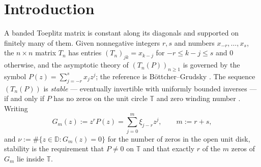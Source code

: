 \documentclass[11pt]{amsart}
\numberwithin{equation}{section}
\theoremstyle{definition}
\theoremstyle{remark}
\newcommand{\T}{\mathbb T}
\newcommand{\D}{\mathbb D}
\begin{document}
\begin{abstract}
small-ball mass at a constant lattice radius, and every fixed primitive
\(q\)-th root has an exact atom local limit
\(\gamma_qN^{-\varphi(q)/2}\), with an explicit kernel-covolume constant
\(\gamma_q\), on the admissible parity residue classes, and has no atom on the
inadmissible classes. Hence any fixed finite set of cyclotomic orders has an
exact-zero asymptotic on its first nonempty totient layer. Consequently a
fixed bounded-denominator non-real grid has a peeled exact-zero layer formula
after removing all orders below any fixed cyclotomic degree threshold, and the
unpeeled fixed-\(Q\) union has the full expansion
\(c_Q(N)/N+e_Q(N)/N^2+o_Q(N^{-2})\).  Here \(c_Q(N)\) receives contributions
\(2\sqrt3/\pi\) from each of the primitive cubic and sixth pairs on \(3\mid N\),
and \(4/\pi\) from the primitive quartic pair on \(4\mid N\), while \(e_Q(N)\)
combines the second-order corrections to those degree-two atoms, their explicit
pairwise overlaps, and the first nonquadratic layer.  After removing the
cyclotomic degree-two roots, that nonquadratic layer is also explicit: orders
\(5,8,10,12\) contribute at scale \(N^{-2}\), with constants
\(20\sqrt5/\pi^2,64/\pi^2,20\sqrt5/\pi^2,48/\pi^2\) on their admissible
divisibility classes.  If the two endpoints are included, the full
bounded-denominator root-of-unity grid has, through order \(N^{-1}\), the exact
central-binomial endpoint-union term plus the same non-real coefficient
\(c_Q(N)/N\).
\end{abstract}

\maketitle

\section{Introduction}\label{sec:intro}

A banded Toeplitz matrix is constant along its diagonals and supported on finitely many of them. Given nonnegative integers $r,s$ and numbers $x_{-r},\dots,x_s$, the $n\times n$ matrix $T_n$ has entries $(T_n)_{jk}=x_{k-j}$ for $-r\le k-j\le s$ and $0$ otherwise, and the asymptotic theory of $(T_n(P))_{n\ge1}$ is governed by the symbol $P(z)=\sum_{j=-r}^{s}x_jz^j$; the reference is B\"ottcher--Grudsky \cite{BG}. The sequence $(T_n(P))$ is \emph{stable} --- eventually invertible with uniformly bounded inverses --- if and only if $P$ has no zeros on the unit circle $\T$ and zero winding number \cite[Ch.~3]{BG}. Writing
\begin{equation}\label{eq:symbol}
  G_m(z):=z^rP(z)=\sum_{j=0}^m\xi_{j-r}z^j,\qquad m:=r+s,
\end{equation}
and $\nu:=\#\{z\in\D:G_m(z)=0\}$ for the number of zeros in the open unit disk, stability is the requirement that $P\ne0$ on $\T$ and that exactly $r$ of the $m$ zeros of $G_m$ lie inside $\T$.
\end{document}
